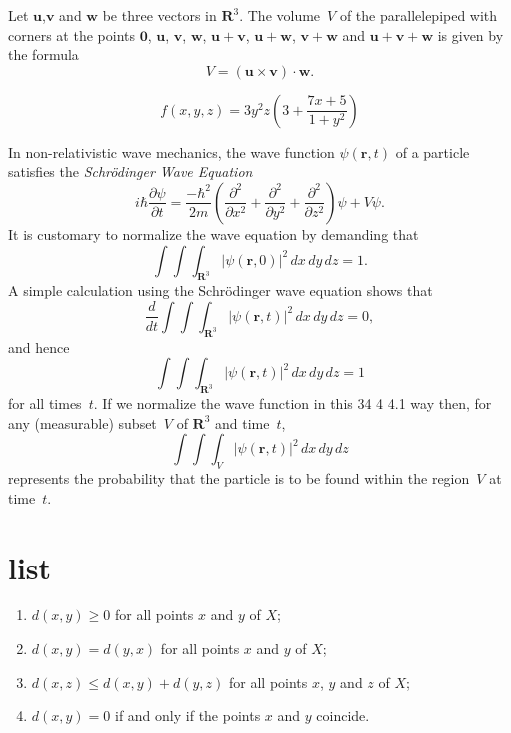 \documentclass[a4paper,12pt]{msty}
\begin{document}
Let $\mathbf{u}$,$\mathbf{v}$ and $\mathbf{w}$ be three
vectors in ${\mathbf R}^3$. The volume~$V$ of the
parallelepiped with corners at the points
$\mathbf{0}$, $\mathbf{u}$, $\mathbf{v}$,
$\mathbf{w}$, $\mathbf{u}+\mathbf{v}$,
$\mathbf{u}+\mathbf{w}$, $\mathbf{v}+\mathbf{w}$
and $\mathbf{u}+\mathbf{v}+\mathbf{w}$
is given by the formula
\[ V = (\mathbf{u} \times \mathbf{v}) \cdot \mathbf{w}.\]

\begin{equation}
f(x,y,z) = 3y^2 z \left( 3 + \frac{7x+5}{1 + y^2} \right)
\end{equation}


In non-relativistic wave mechanics, the wave function
     $\psi(\mathbf{r},t)$ of a particle satisfies the
     \textit{Schr\"{o}dinger Wave Equation}
     \[ i\hbar\frac{\partial \psi}{\partial t}
       = \frac{-\hbar^2}{2m} \left(
         \frac{\partial^2}{\partial x^2}
         + \frac{\partial^2}{\partial y^2}
         + \frac{\partial^2}{\partial z^2}
       \right) \psi + V \psi.\]
     It is customary to normalize the wave equation by
     demanding that
     \[ \int \!\!\! \int \!\!\! \int_{\textbf{R}^3}
           \left| \psi(\mathbf{r},0) \right|^2\,dx\,dy\,dz = 1.\]
     A simple calculation using the Schr\"{o}dinger wave
     equation shows that
     \[ \frac{d}{dt} \int \!\!\! \int \!\!\! \int_{\textbf{R}^3}
           \left| \psi(\mathbf{r},t) \right|^2\,dx\,dy\,dz = 0,\]
     and hence
     \[ \int \!\!\! \int \!\!\! \int_{\textbf{R}^3}
           \left| \psi(\mathbf{r},t) \right|^2\,dx\,dy\,dz = 1\]
     for all times~$t$. If we normalize the wave function in this
34
4 4.1
way then, for any (measurable) subset~$V$ of $\textbf{R}^3$
and time~$t$,
\[ \int \!\!\! \int \!\!\! \int_V
      \left| \psi(\mathbf{r},t) \right|^2\,dx\,dy\,dz\]
represents the probability that the particle is to be found
within the region~$V$ at time~$t$.

\section{list}

\begin{enumerate}
\item
$d(x,y) \geq 0$ for all points $x$ and $y$ of $X$;
\item
$d(x,y) = d(y,x)$ for all points $x$ and $y$ of $X$;
\item
$d(x,z) \leq d(x,y) + d(y,z)$ for all points $x$, $y$
and $z$ of $X$;
\item
$d(x,y) = 0$ if and only if the points $x$ and $y$
coincide.
\end{enumerate}
\end{document}
